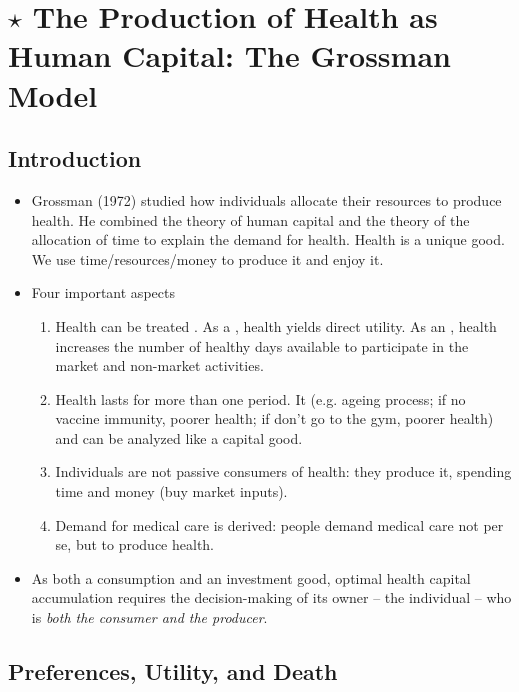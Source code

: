 \section{$\star$ The Production of Health as Human Capital: The Grossman Model}

    \subsection{Introduction}
    
        \begin{itemize}
            \item Grossman (1972) studied how individuals allocate their resources to produce health. He combined the theory of human capital and the theory of the allocation of time to explain the demand for health. Health is a unique good. We use time/resources/money to produce it and enjoy it.
            \item Four important aspects
            \begin{enumerate}
                    \item Health can be treated . As a , health yields direct utility. As an , health increases the number of healthy days available to participate in the market and non-market activities.
                    \item Health lasts for more than one period. It  (e.g. ageing process; if no vaccine immunity, poorer health; if don't go to the gym, poorer health) and can be analyzed like a capital good.
                    \item Individuals are not passive consumers of health: they produce it, spending time and money (buy market inputs).
                    \item Demand for medical care is derived: people demand medical care not per se, but to produce health.
                \end{enumerate}
            \item As both a consumption and an investment good, optimal health capital accumulation requires the decision-making of its owner – the individual – who is \emph{both the consumer and the producer}.    
        \end{itemize}        

    \subsection{Preferences, Utility, and Death}
    
